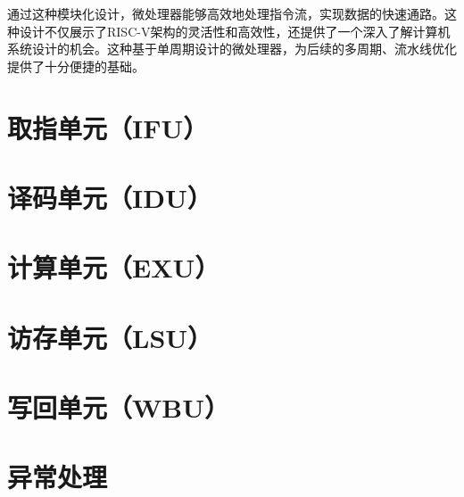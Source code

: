 通过这种模块化设计，微处理器能够高效地处理指令流，实现数据的快速通路。这种设计不仅展示了RISC-V架构的灵活性和高效性，还提供了一个深入了解计算机系统设计的机会。这种基于单周期设计的微处理器，为后续的多周期、流水线优化提供了十分便捷的基础。

\section{取指单元（IFU）}

\section{译码单元（IDU）}

\section{计算单元（EXU）}

\section{访存单元（LSU）}

\section{写回单元（WBU）}

\section{异常处理}




